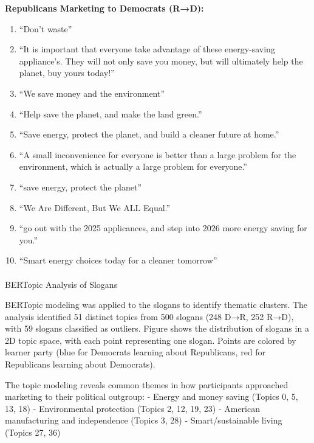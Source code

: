\documentclass[
  11pt,
  oneside]{article}
\makeatletter
\let\oldparagraph\paragraph
\renewcommand{\paragraph}{
    \@ifstar
      \xxxParagraphStar
      \xxxParagraphNoStar
  }
\newcommand{\xxxParagraphStar}[1]{\oldparagraph*{#1}\mbox{}}
\newcommand{\xxxParagraphNoStar}[1]{\oldparagraph{#1}\mbox{}}
\providecommand{\tightlist}{%
  \setlength{\itemsep}{0pt}\setlength{\parskip}{0pt}}\usepackage{longtable,booktabs,array}
\makeatother
\begin{document}
\textbf{Republicans Marketing to Democrats (R→D):}

\begin{enumerate}
\def\labelenumi{\arabic{enumi}.}
\tightlist
\item
  ``Don't waste''
\item
  ``It is important that everyone take advantage of these energy-saving
  appliance's. They will not only save you money, but will ultimately
  help the planet, buy yours today!''
\item
  ``We save money and the environment''
\item
  ``Help save the planet, and make the land green.''
\item
  ``Save energy, protect the planet, and build a cleaner future at
  home.''
\item
  ``A small inconvenience for everyone is better than a large problem
  for the environment, which is actually a large problem for everyone.''
\item
  ``save energy, protect the planet''
\item
  ``We Are Different, But We ALL Equal.''
\item
  ``go out with the 2025 applicances, and step into 2026 more energy
  saving for you.''
\item
  ``Smart energy choices today for a cleaner tomorrow''
\end{enumerate}

\paragraph{BERTopic Analysis of
Slogans}\label{bertopic-analysis-of-slogans}

BERTopic modeling was applied to the slogans to identify thematic
clusters. The analysis identified 51 distinct topics from 500 slogans
(248 D→R, 252 R→D), with 59 slogans classified as outliers. Figure shows
the distribution of slogans in a 2D topic space, with each point
representing one slogan. Points are colored by learner party (blue for
Democrats learning about Republicans, red for Republicans learning about
Democrats).

The topic modeling reveals common themes in how participants approached
marketing to their political outgroup: - Energy and money saving (Topics
0, 5, 13, 18) - Environmental protection (Topics 2, 12, 19, 23) -
American manufacturing and independence (Topics 3, 28) -
Smart/sustainable living (Topics 27, 36)
\end{document}
